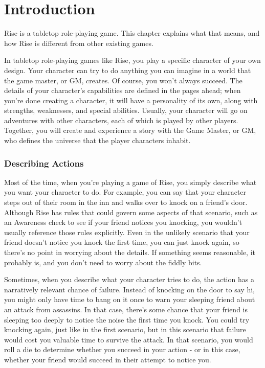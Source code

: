 \chapter{Introduction}

Rise is a tabletop role-playing game.
This chapter explains what that means, and how Rise is different from other existing games.

  In tabletop role-playing games like Rise, you play a specific character of your own design.
  Your character can try to do anything you can imagine in a world that the game master, or GM, creates.
  Of course, you won't always succeed.
  The details of your character's capabilities are defined in the pages ahead; when you're done creating a character, it will have a personality of its own, along with strengths, weaknesses, and special abilities.
  Usually, your character will go on adventures with other characters, each of which is played by other players.
  Together, you will create and experience a story with the Game Master, or GM, who defines the universe that the player characters inhabit.

  \subsection{Describing Actions}
    Most of the time, when you're playing a game of Rise, you simply describe what you want your character to do.
    For example, you can say that your character steps out of their room in the inn and walks over to knock on a friend's door.
    Although Rise has rules that could govern some aspects of that scenario, such as an Awareness check to see if your friend notices you knocking, you wouldn't usually reference those rules explicitly.
    Even in the unlikely scenario that your friend doesn't notice you knock the first time, you can just knock again, so there's no point in worrying about the details.
    If something seems reasonable, it probably is, and you don't need to worry about the fiddly bits.

    Sometimes, when you describe what your character tries to do, the action has a narratively relevant chance of failure.
    Instead of knocking on the door to say hi, you might only have time to bang on it once to warn your sleeping friend about an attack from assassins.
    In that case, there's some chance that your friend is sleeping too deeply to notice the noise the first time you knock.
    You could try knocking again, just like in the first scenario, but in this scenario that failure would cost you valuable time to survive the attack.
    In that scenario, you would roll a die to determine whether you succeed in your action - or in this case, whether your friend would succeed in their attempt to notice you.

